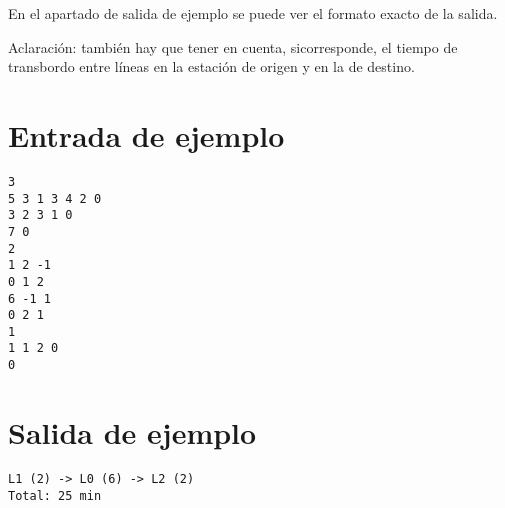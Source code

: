 \documentclass[a4paper]{article}
\begin{document}
En el apartado de salida de ejemplo se puede ver el formato exacto de la salida.

\medskip

Aclaración: también hay que tener en cuenta, sicorresponde, el tiempo de transbordo entre líneas en la estación de origen y en la de destino.

\section*{Entrada de ejemplo}

\begin{verbatim}
3
5 3 1 3 4 2 0
3 2 3 1 0
7 0
2
1 2 -1
0 1 2
6 -1 1
0 2 1
1
1 1 2 0
0
\end{verbatim}

\section*{Salida de ejemplo}

\begin{verbatim}
L1 (2) -> L0 (6) -> L2 (2)
Total: 25 min
\end{verbatim}
\end{document}
